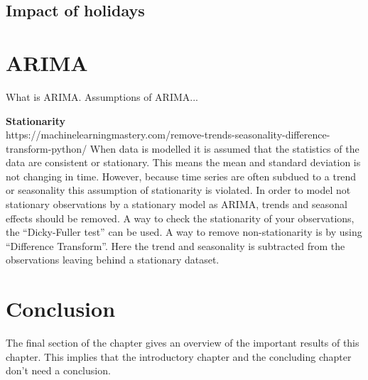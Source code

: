 \subsection{Impact of holidays}



\section{ARIMA}
What is ARIMA. 
Assumptions of ARIMA...

\textbf{Stationarity}\\
 https://machinelearningmastery.com/remove-trends-seasonality-difference-transform-python/
When data is modelled it is assumed that the statistics of the data are consistent or stationary. This means the mean and standard deviation is not changing in time. However, because time series are often subdued to a trend or seasonality this assumption of stationarity is violated. In order to model not stationary observations by a stationary model as ARIMA, trends and seasonal effects should be removed. A way to check the stationarity of your observations, the ``Dicky-Fuller test'' can be used.
A way to remove non-stationarity is by using ``Difference Transform''. Here the trend and seasonality is subtracted from the observations leaving behind a stationary dataset.


\section{Conclusion}
The final section of the chapter gives an overview of the important results
of this chapter. This implies that the introductory chapter and the
concluding chapter don't need a conclusion.





